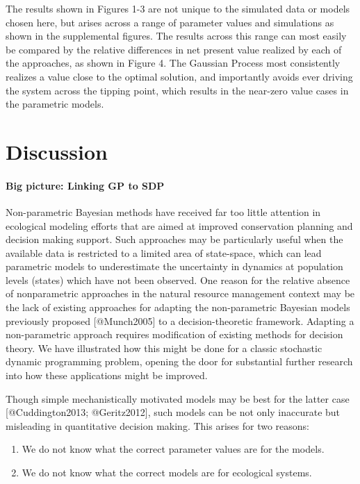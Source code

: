 \documentclass[author-year, review]{elsarticle} %
\begin{document}
The results shown in Figures 1-3 are not unique to the simulated data or
models chosen here, but arises across a range of parameter values and
simulations as shown in the supplemental figures. The results across
this range can most easily be compared by the relative differences in
net present value realized by each of the approaches, as shown in Figure
4. The Gaussian Process most consistently realizes a value close to the
optimal solution, and importantly avoids ever driving the system across
the tipping point, which results in the near-zero value cases in the
parametric models.

\section{Discussion}

\paragraph{Big picture: Linking GP to SDP}

Non-parametric Bayesian methods have received far too little attention
in ecological modeling efforts that are aimed at improved conservation
planning and decision making support. Such approaches may be
particularly useful when the available data is restricted to a limited
area of state-space, which can lead parametric models to underestimate
the uncertainty in dynamics at population levels (states) which have not
been observed. One reason for the relative absence of nonparametric
approaches in the natural resource management context may be the lack of
existing approaches for adapting the non-parametric Bayesian models
previously proposed {[}@Munch2005{]} to a decision-theoretic framework.
Adapting a non-parametric approach requires modification of existing
methods for decision theory. We have illustrated how this might be done
for a classic stochastic dynamic programming problem, opening the door
for substantial further research into how these applications might be
improved.

Though simple mechanistically motivated models may be best for the
latter case {[}@Cuddington2013; @Geritz2012{]}, such models can be not
only inaccurate but misleading in quantitative decision making. This
arises for two reasons:

\begin{enumerate}
\def\labelenumi{\arabic{enumi}.}
\itemsep1pt\parskip0pt
\item
  We do not know what the correct parameter values are for the models.
\item
  We do not know what the correct models are for ecological systems.
\end{enumerate}
\end{document}
